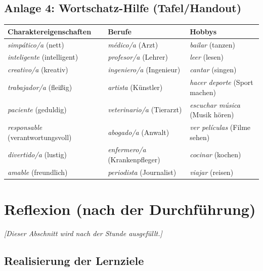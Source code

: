 \documentclass[11pt, a4paper]{article}
\newcommand{\es}[1]{\textcolor{spanisch}{\textit{#1}}}
\begin{document}
\vspace{1cm}

\subsection*{Anlage 4: Wortschatz-Hilfe (Tafel/Handout)}

\begin{center}
\begin{tabular}{|l|l|l|}
    \hline
    \textbf{Charaktereigenschaften} & \textbf{Berufe} & \textbf{Hobbys} \\
    \hline
    \es{simpático/a} (nett) & \es{médico/a} (Arzt) & \es{bailar} (tanzen) \\
    \es{inteligente} (intelligent) & \es{profesor/a} (Lehrer) & \es{leer} (lesen) \\
    \es{creativo/a} (kreativ) & \es{ingeniero/a} (Ingenieur) & \es{cantar} (singen) \\
    \es{trabajador/a} (fleißig) & \es{artista} (Künstler) & \es{hacer deporte} (Sport machen) \\
    \es{paciente} (geduldig) & \es{veterinario/a} (Tierarzt) & \es{escuchar música} (Musik hören) \\
    \es{responsable} (verantwortungsvoll) & \es{abogado/a} (Anwalt) & \es{ver películas} (Filme sehen) \\
    \es{divertido/a} (lustig) & \es{enfermero/a} (Krankenpfleger) & \es{cocinar} (kochen) \\
    \es{amable} (freundlich) & \es{periodista} (Journalist) & \es{viajar} (reisen) \\
    \hline
\end{tabular}
\end{center}


\newpage
\section{Reflexion (nach der Durchführung)}

\textit{[Dieser Abschnitt wird nach der Stunde ausgefüllt.]}

\subsection{Realisierung der Lernziele}
\end{document}
